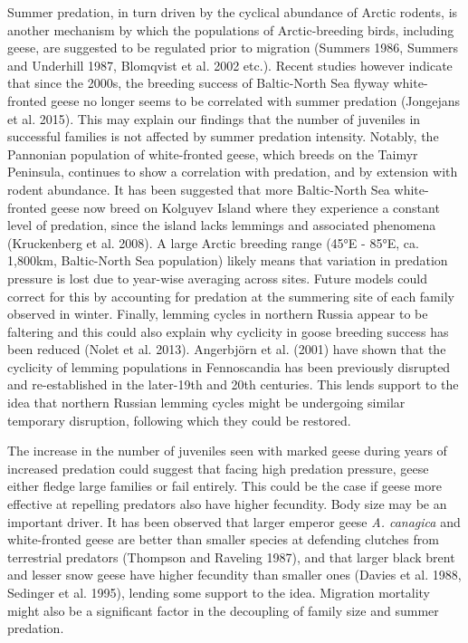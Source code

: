 \documentclass[10pt,twocolumn]{paper}
\begin{document}
Summer predation, in turn driven by the cyclical abundance of Arctic
rodents, is another mechanism by which the populations of
Arctic-breeding birds, including geese, are suggested to be regulated
prior to migration (Summers 1986, Summers and Underhill 1987, Blomqvist
et al. 2002 etc.). Recent studies however indicate that since the 2000s,
the breeding success of Baltic-North Sea flyway white-fronted geese no
longer seems to be correlated with summer predation (Jongejans et al.
2015). This may explain our findings that the number of juveniles in
successful families is not affected by summer predation intensity.
Notably, the Pannonian population of white-fronted geese, which breeds
on the Taimyr Peninsula, continues to show a correlation with predation,
and by extension with rodent abundance. It has been suggested that more
Baltic-North Sea white-fronted geese now breed on Kolguyev Island where
they experience a constant level of predation, since the island lacks
lemmings and associated phenomena (Kruckenberg et al. 2008). A large
Arctic breeding range (45°E - 85°E, ca. 1,800km, Baltic-North Sea
population) likely means that variation in predation pressure is lost
due to year-wise averaging across sites. Future models could correct for
this by accounting for predation at the summering site of each family
observed in winter. Finally, lemming cycles in northern Russia appear to
be faltering and this could also explain why cyclicity in goose breeding
success has been reduced (Nolet et al. 2013). Angerbjörn et al. (2001)
have shown that the cyclicity of lemming populations in Fennoscandia has
been previously disrupted and re-established in the later-19th and 20th
centuries. This lends support to the idea that northern Russian lemming
cycles might be undergoing similar temporary disruption, following which
they could be restored.

The increase in the number of juveniles seen with marked geese during
years of increased predation could suggest that facing high predation
pressure, geese either fledge large families or fail entirely. This
could be the case if geese more effective at repelling predators also
have higher fecundity. Body size may be an important driver. It has been
observed that larger emperor geese \emph{A. canagica} and white-fronted
geese are better than smaller species at defending clutches from
terrestrial predators (Thompson and Raveling 1987), and that larger
black brent and lesser snow geese have higher fecundity than smaller
ones (Davies et al. 1988, Sedinger et al. 1995), lending some support to
the idea. Migration mortality might also be a significant factor in the
decoupling of family size and summer predation.
\end{document}
